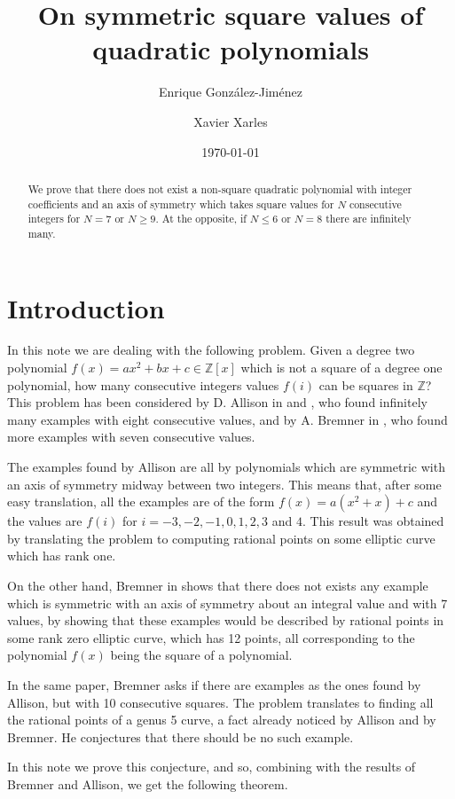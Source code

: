 \documentclass[a4paper,12pt]{amsart}
\title{On symmetric square values of quadratic polynomials}
\author[Enrique Gonz\'alez-Jim\'enez]{Enrique Gonz\'alez-Jim\'enez}
\author[Xavier Xarles]{Xavier Xarles}
\date{\today}
\theoremstyle{remark}
\theoremstyle{definition}
\begin{document}
\maketitle

\begin{abstract}
We prove that there does not exist a non-square quadratic
polynomial with integer coefficients and an axis of symmetry which
takes square values for $N$ consecutive integers for $N=7$ or
$N\geq 9$. At the opposite, if $N\le 6$ or $N=8$ there are
infinitely many.
\end{abstract}

\section{Introduction}

In this note we are dealing with the following problem. Given a
degree two polynomial $f(x)=ax^2+bx+c \in {{\mathbb{Z}}}[x]$ which is not a
square of a degree one polynomial, how many consecutive integers
values $f(i)$ can be squares in ${{\mathbb{Z}}}$? This problem has been
considered by D. Allison in \cite{All1} and \cite{All2}, who found
infinitely many examples with eight consecutive values, and by A.
Bremner in \cite{Bre}, who found more examples with seven
consecutive values.

The examples found by Allison are all  by polynomials
which are symmetric with an axis of symmetry midway between two
integers. This means that, after some easy translation, all the
examples are of the form $f(x)=a(x^2+x)+c$ and the values are
$f(i)$ for $i=-3,-2,-1,0,1,2,3$ and $4$. This result was obtained
by translating the problem to computing rational points on some
elliptic curve which has rank one.

On the other hand, Bremner in \cite{Bre} shows that there does not
exists any example which is symmetric with an axis of symmetry about
an integral value and with 7 values, by showing that these examples
would be described by rational points in some rank zero elliptic
curve, which has 12 points, all corresponding to the polynomial
$f(x)$ being the square of a polynomial.

In the same paper, Bremner asks if there are examples as the ones
found by Allison, but with 10 consecutive squares. The problem
translates to finding all the rational points of a genus 5 curve,
a fact already noticed by Allison and by Bremner. He conjectures
that there should be no such example.

In this note we prove this conjecture, and so, combining with the
results of Bremner and Allison, we get the following theorem.
\end{document}
